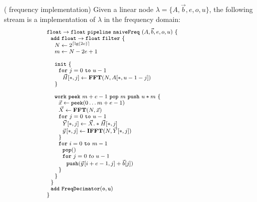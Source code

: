 \begin{transformation} ({\Naive} frequency implementation)
Given a linear node $\lambda = \{A, {\vec b}, e, o, u\}$, the
following stream is a {\naive} implementation of $\lambda$ in the
frequency domain:
\begin{equation} \nonumber
{\small
  \begin{array}{ll}
    {\tt float \rightarrow float}~{\tt pipeline~naiveFreq~}(A, {\vec b}, e, o, u){\tt ~\{} & \hspace{40pt}\\
    ~~{\tt add~float \rightarrow float~filter~\{}\\
    ~~~~N \leftarrow 2^{\lceil \lg(2e) \rceil} \\
    ~~~~m \leftarrow N-2e+1 \\
    \\
    ~~~~{\tt init}~{\tt \{} \\
    ~~~~~~{\tt for}~j=0~{\tt to}~u-1\\
    ~~~~~~~~\vec{H}[*,j] \leftarrow \mathbf{FFT}(N,A[*,u-1-j]) \\
    ~~~~{\tt \}} \\
    \\
    ~~~~{\tt work}~{\tt peek}~m+e-1~{\tt pop}~m~{\tt push}~u*m~{\tt \{} \\
    ~~~~~~\vec{x} \leftarrow {\tt peek}(0 \dots m+e-1 ) \\
    ~~~~~~\vec{X} \leftarrow \mathbf{FFT} (N, \vec{x}) \\
    ~~~~~~{\tt for}~j=0~{\tt to}~u-1\\
    ~~~~~~~~\vec{Y}[*,j] \leftarrow \vec{X} .* \vec{H}[*,j] \\
    ~~~~~~~~\vec{y}\hspace{1pt}[*,j] \leftarrow \mathbf{IFFT}(N, \vec{Y}[*,j]) \\
    ~~~~~~{\tt \}} \\
    ~~~~~~{\tt for}~i=0~{\tt to}~m-1\\
    ~~~~~~~~{\tt pop()} \\
    ~~~~~~~~{\tt for}~j=0~to~u-1\\
    ~~~~~~~~~~{\tt push}(\vec{y}\hspace{1pt}[i+e-1,j] + {\vec b}[j])\\
    ~~~~~~{\tt \}} \\
    ~~~~{\tt \}} \\
    ~~{\tt \}} \\
    ~~{\tt add~FreqDecimator(o, u)} \\
    {\tt \}} \\ ~ \\

\end{array}}
\end{equation}
\end{transformation}
